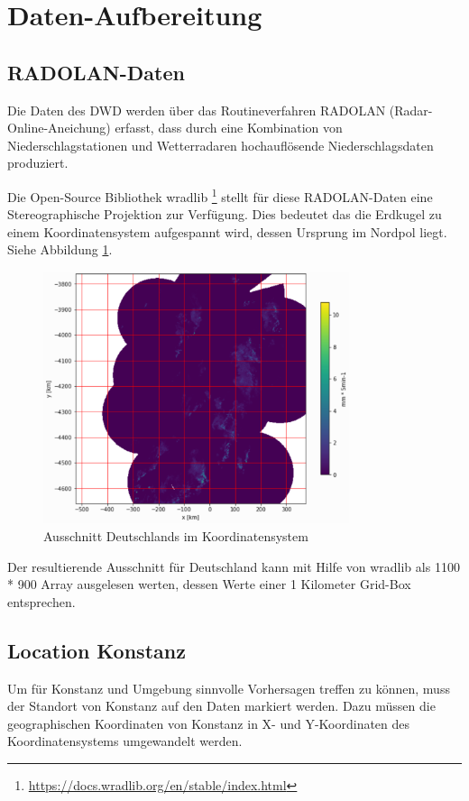\section{Daten-Aufbereitung}

\subsection{RADOLAN-Daten}

Die Daten des DWD werden über das Routineverfahren RADOLAN (Radar-Online-Aneichung) erfasst, dass durch eine Kombination von Niederschlagstationen und Wetterradaren hochauflösende Niederschlagsdaten produziert. 

Die Open-Source Bibliothek wradlib \footnote{\url{https://docs.wradlib.org/en/stable/index.html}} stellt für diese RADOLAN-Daten eine Stereographische Projektion zur Verfügung. Dies bedeutet das die Erdkugel zu einem Koordinatensystem aufgespannt wird, dessen Ursprung im Nordpol liegt. Siehe Abbildung  \ref{rz}.

\begin{figure}[H]
	\centering
	\includegraphics[width=0.8\textwidth]{pics/RZ_product.PNG}
	\caption{Ausschnitt Deutschlands im Koordinatensystem}
	\label{rz}
\end{figure}

Der resultierende Ausschnitt für Deutschland kann mit Hilfe von wradlib als 1100 * 900 Array ausgelesen werten, dessen Werte einer 1 Kilometer Grid-Box entsprechen.

\subsection{Location Konstanz}
Um für Konstanz und Umgebung sinnvolle Vorhersagen treffen zu können, muss der Standort von Konstanz auf den Daten markiert werden. Dazu müssen die geographischen Koordinaten von Konstanz in X- und Y-Koordinaten des Koordinatensystems umgewandelt werden.

